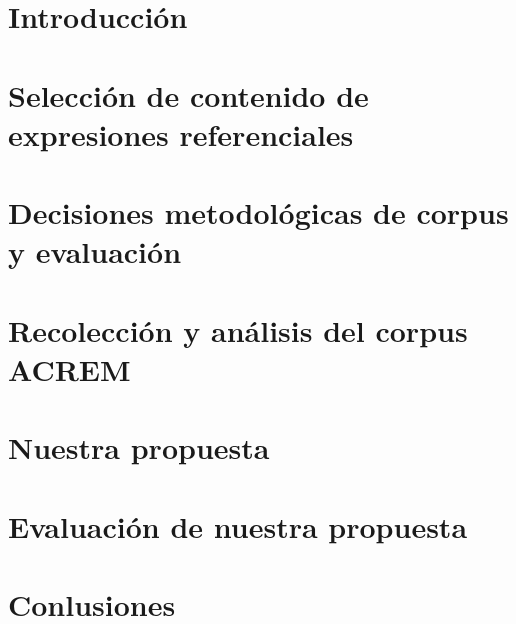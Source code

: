 %

\mainmatter %



\chapter{Introducci\'on}
\label{ch:intro}

\chapter{Selecci\'on de contenido de expresiones referenciales}
\label{ch:seleccion}


\chapter{Decisiones metodol\'ogicas de corpus y evaluaci\'on}
\label{ch:metodologia}


\chapter{Recolecci\'on y an\'alisis del corpus ACREM}
\label{ch:aplicacion}


\chapter{Nuestra propuesta}
\label{ch:algoritmo}

\chapter{Evaluaci\'on de nuestra propuesta}
\label{ch:corpus}


\chapter{ Conlusiones}
\label{ch:conlusiones}

\vskip 0.2in




